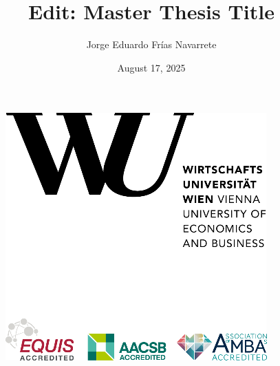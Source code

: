 \documentclass[
  12pt,
  a4paper,
  openany]{scrbook}
\title{Edit: Master Thesis Title}
\author{Jorge Eduardo Frías Navarrete}
\date{August 17, 2025}
\begin{document}
\frontmatter


\thispagestyle{empty}
\begin{figure}[h!]
    \raggedleft
    \includegraphics[scale=0.9]{pictures/WULogo.png}
\end{figure}

\vspace{1em}
\end{document}
